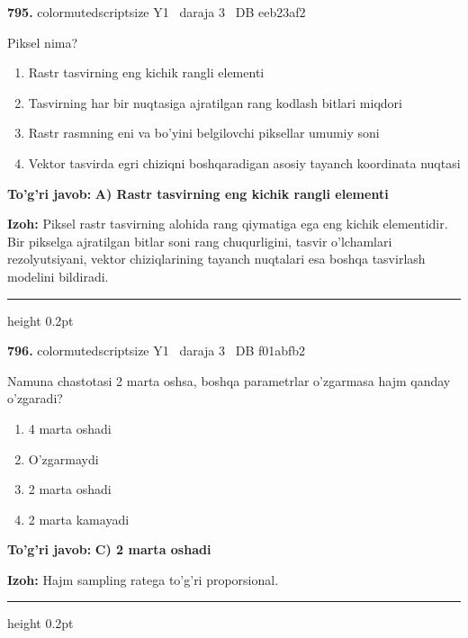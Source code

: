 \documentclass[10pt,a4paper,oneside]{article}
\begin{document}
\noindent\textbf{\color{ink}795.}  {color{muted}scriptsize Y1 \textbullet\ daraja 3 \textbullet\ DB eeb23af2}
\par
Piksel nima?
\begin{enumerate}[label=\Alph*),leftmargin=9mm]
\item Rastr tasvirning eng kichik rangli elementi
\item Tasvirning har bir nuqtasiga ajratilgan rang kodlash bitlari miqdori
\item Rastr rasmning eni va bo'yini belgilovchi piksellar umumiy soni
\item Vektor tasvirda egri chiziqni boshqaradigan asosiy tayanch koordinata nuqtasi
\end{enumerate}
\begin{tcolorbox}[enhanced,breakable,colback=teal!4,colframe=teal!50!black,boxrule=0.5pt,arc=1.1mm,left=3mm,right=3mm,top=1.7mm,bottom=1.7mm,before skip=2mm,after skip=2mm]
\textbf{\color{teal}To'g'ri javob:} \textbf{A) Rastr tasvirning eng kichik rangli elementi}
\par\smallskip
\textbf{Izoh:} Piksel rastr tasvirning alohida rang qiymatiga ega eng kichik elementidir. Bir pikselga ajratilgan bitlar soni rang chuqurligini, tasvir o'lchamlari rezolyutsiyani, vektor chiziqlarining tayanch nuqtalari esa boshqa tasvirlash modelini bildiradi.
\end{tcolorbox}
\vspace{2mm}\hrule height 0.2pt \vspace{3mm}

\noindent\textbf{\color{ink}796.}  {color{muted}scriptsize Y1 \textbullet\ daraja 3 \textbullet\ DB f01abfb2}
\par
Namuna chastotasi 2 marta oshsa, boshqa parametrlar o'zgarmasa hajm qanday o'zgaradi?
\begin{enumerate}[label=\Alph*),leftmargin=9mm]
\item 4 marta oshadi
\item O'zgarmaydi
\item 2 marta oshadi
\item 2 marta kamayadi
\end{enumerate}
\begin{tcolorbox}[enhanced,breakable,colback=teal!4,colframe=teal!50!black,boxrule=0.5pt,arc=1.1mm,left=3mm,right=3mm,top=1.7mm,bottom=1.7mm,before skip=2mm,after skip=2mm]
\textbf{\color{teal}To'g'ri javob:} \textbf{C) 2 marta oshadi}
\par\smallskip
\textbf{Izoh:} Hajm sampling ratega to'g'ri proporsional.
\end{tcolorbox}
\vspace{2mm}\hrule height 0.2pt \vspace{3mm}
\end{document}
